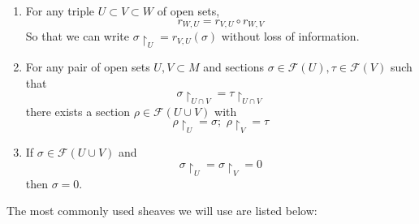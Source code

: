 \documentclass{article}
\begin{document}
\begin{enumerate}
\item For any triple $U \subset V \subset W$ of open sets, 
	\[
		r_{W,U} = r_{V,U} \circ r_{W,V}
	\]
	So that we can write $\sigma \restriction_U = r_{V,U} \left( \sigma \right) $ without loss of information.
\item For any pair of open sets $U, V \subset M$ and sections $\sigma \in \mathcal{F}(U), \tau \in \mathcal{F}(V)$ such that 
\[
	\sigma \restriction_{U \cap V} = \tau \restriction_{U \cap V}
\]
there exists a section $ \rho \in \mathcal{F}(U \cup V)$ with 
\[
\rho \restriction_U = \sigma; \hspace{4pt} \rho \restriction_V = \tau
\]
\item If $\sigma \in \mathcal{F}(U \cup V)$ and
\[
\sigma \restriction_U = \sigma \restriction_V = 0
\]
then $\sigma = 0$.
\end{enumerate}

The most commonly used sheaves we will use are listed below:
\end{document}
